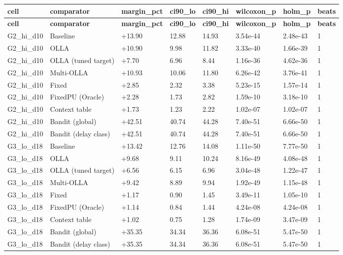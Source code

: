 \documentclass[10pt]{article}
\begin{document}
\begin{landscape}
\begin{longtable}{@{}llllllll@{}}
\toprule
\textbf{cell} & \textbf{comparator} & \textbf{margin\_pct} & \textbf{ci90\_lo} & \textbf{ci90\_hi} & \textbf{wilcoxon\_p} & \textbf{holm\_p} & \textbf{beats} \\
\midrule
\endfirsthead
\toprule
\textbf{cell} & \textbf{comparator} & \textbf{margin\_pct} & \textbf{ci90\_lo} & \textbf{ci90\_hi} & \textbf{wilcoxon\_p} & \textbf{holm\_p} & \textbf{beats} \\
\midrule
\endhead
G2\_hi\_d10 & Baseline & +13.90 & 12.88 & 14.93 & 3.54e-44 & 2.48e-43 & 1 \\
G2\_hi\_d10 & OLLA & +10.90 & 9.98 & 11.82 & 3.33e-40 & 1.66e-39 & 1 \\
G2\_hi\_d10 & OLLA (tuned target) & +7.70 & 6.96 & 8.44 & 1.16e-36 & 4.62e-36 & 1 \\
G2\_hi\_d10 & Multi-OLLA & +10.93 & 10.06 & 11.80 & 6.26e-42 & 3.76e-41 & 1 \\
G2\_hi\_d10 & Fixed & +2.85 & 2.32 & 3.38 & 5.23e-15 & 1.57e-14 & 1 \\
G2\_hi\_d10 & FixedPU (Oracle) & +2.28 & 1.73 & 2.82 & 1.59e-10 & 3.18e-10 & 1 \\
G2\_hi\_d10 & Context table & +1.73 & 1.23 & 2.22 & 1.02e-07 & 1.02e-07 & 1 \\
G2\_hi\_d10 & Bandit (global) & +42.51 & 40.74 & 44.28 & 7.40e-51 & 6.66e-50 & 1 \\
G2\_hi\_d10 & Bandit (delay class) & +42.51 & 40.74 & 44.28 & 7.40e-51 & 6.66e-50 & 1 \\
G3\_lo\_d18 & Baseline & +13.42 & 12.76 & 14.08 & 1.11e-50 & 7.77e-50 & 1 \\
G3\_lo\_d18 & OLLA & +9.68 & 9.11 & 10.24 & 8.16e-49 & 4.08e-48 & 1 \\
G3\_lo\_d18 & OLLA (tuned target) & +6.56 & 6.15 & 6.96 & 3.04e-48 & 1.22e-47 & 1 \\
G3\_lo\_d18 & Multi-OLLA & +9.42 & 8.89 & 9.94 & 1.92e-49 & 1.15e-48 & 1 \\
G3\_lo\_d18 & Fixed & +1.17 & 0.90 & 1.45 & 3.49e-11 & 1.05e-10 & 1 \\
G3\_lo\_d18 & FixedPU (Oracle) & +1.14 & 0.84 & 1.44 & 4.24e-08 & 4.24e-08 & 1 \\
G3\_lo\_d18 & Context table & +1.02 & 0.75 & 1.28 & 1.74e-09 & 3.47e-09 & 1 \\
G3\_lo\_d18 & Bandit (global) & +35.35 & 34.34 & 36.36 & 6.08e-51 & 5.47e-50 & 1 \\
G3\_lo\_d18 & Bandit (delay class) & +35.35 & 34.34 & 36.36 & 6.08e-51 & 5.47e-50 & 1 \\

\end{longtable}
\end{landscape}
\end{document}
